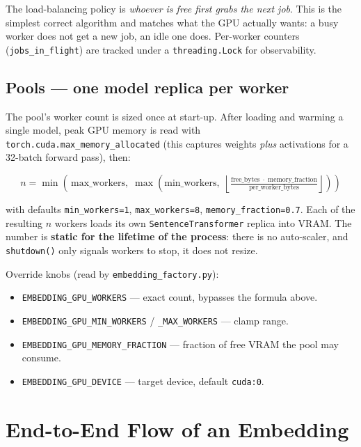 \documentclass[11pt,a4paper]{article}
\begin{document}
The load-balancing policy is \emph{whoever is free first grabs the
next job}. This is the simplest correct algorithm and matches what the
GPU actually wants: a busy worker does not get a new job, an idle one
does. Per-worker counters (\texttt{jobs\_in\_flight}) are tracked under
a \texttt{threading.Lock} for observability.

\subsection{Pools --- one model replica per worker}

The pool's worker count is sized once at start-up. After loading and
warming a single model, peak GPU memory is read with
\texttt{torch.cuda.max\_memory\_allocated} (this captures weights
\emph{plus} activations for a 32-batch forward pass), then:

\[
n = \min\!\left(\, \mathrm{max\_workers},\;
        \max\!\left(\mathrm{min\_workers},\;
        \left\lfloor
          \tfrac{\mathrm{free\_bytes}\;\cdot\;\mathrm{memory\_fraction}}
                {\mathrm{per\_worker\_bytes}}
        \right\rfloor
        \right) \right)
\]

with defaults \texttt{min\_workers=1}, \texttt{max\_workers=8},
\texttt{memory\_fraction=0.7}. Each of the resulting $n$ workers loads
its own \texttt{SentenceTransformer} replica into VRAM. The number is
\textbf{static for the lifetime of the process}: there is no
auto-scaler, and \texttt{shutdown()} only signals workers to stop, it
does not resize.

Override knobs (read by \texttt{embedding\_factory.py}):

\begin{itemize}[leftmargin=*]
  \item \texttt{EMBEDDING\_GPU\_WORKERS} --- exact count, bypasses the
        formula above.
  \item \texttt{EMBEDDING\_GPU\_MIN\_WORKERS} / \texttt{\_MAX\_WORKERS} ---
        clamp range.
  \item \texttt{EMBEDDING\_GPU\_MEMORY\_FRACTION} --- fraction of free
        VRAM the pool may consume.
  \item \texttt{EMBEDDING\_GPU\_DEVICE} --- target device, default
        \texttt{cuda:0}.
\end{itemize}

\section{End-to-End Flow of an Embedding}
\end{document}
